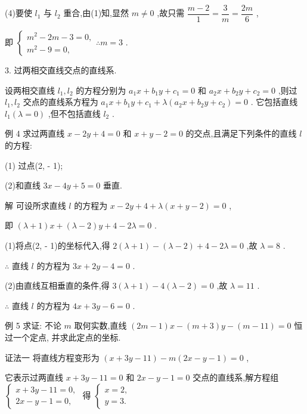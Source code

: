 (4)要使 ${l}_{1}$ 与 ${l}_{2}$ 重合,由(1)知,显然 $m \neq  0$ ,故只需 $\dfrac{m - 2}{1} = \dfrac{3}{m} = \dfrac{2m}{6}$ ,

即 $\left\{  {\begin{array}{l} {m}^{2} - {2m} - 3 = 0, \\  {m}^{2} - 9 = 0, \end{array}\therefore m = 3}\right.$ .

3. 过两相交直线交点的直线系.

设两相交直线 ${l}_{1},{l}_{2}$ 的方程分别为 ${a}_{1}x + {b}_{1}y + {c}_{1} = 0$ 和 ${a}_{2}x + {b}_{2}y + {c}_{2} = 0$ ,则过 ${l}_{1},{l}_{2}$ 交点的直线系方程为 ${a}_{1}x + {b}_{1}y + {c}_{1} + \lambda \left( {{a}_{2}x + {b}_{2}y + {c}_{2}}\right)  = 0$ . 它包括直线 ${l}_{1}\left( {\lambda  = 0}\right)$ ,但不包括直线 ${l}_{2}$ .

例 4 求过两直线 $x - {2y} + 4 = 0$ 和 $x + y - 2 = 0$ 的交点,且满足下列条件的直线 $l$ 的方程:

(1) 过点(2, - 1);

(2)和直线 ${3x} - {4y} + 5 = 0$ 垂直.

解 可设所求直线 $l$ 的方程为 $x - {2y} + 4 + \lambda \left( {x + y - 2}\right)  = 0$ ,

即 $\left( {\lambda  + 1}\right) x + \left( {\lambda  - 2}\right) y + 4 - {2\lambda } = 0$ .

(1)将点(2, - 1)的坐标代入,得 $2\left( {\lambda  + 1}\right)  - \left( {\lambda  - 2}\right)  + 4 - {2\lambda } = 0$ ,故 $\lambda  = 8$ .

$\therefore$ 直线 $l$ 的方程为 ${3x} + {2y} - 4 = 0$ .

(2)由直线互相垂直的条件,得 $3\left( {\lambda  + 1}\right)  - 4\left( {\lambda  - 2}\right)  = 0$ ,故 $\lambda  = {11}$ .

$\therefore$ 直线 $l$ 的方程为 ${4x} + {3y} - 6 = 0$ .

例 5 求证: 不论 $m$ 取何实数,直线 $\left( {{2m} - 1}\right) x - \left( {m + 3}\right) y - \left( {m - {11}}\right)  = 0$ 恒过一个定点, 并求此定点的坐标.

证法一 将直线方程变形为 $\left( {x + {3y} - {11}}\right)  - m\left( {{2x} - y - 1}\right)  = 0$ ,

它表示过两直线 $x + {3y} - {11} = 0$ 和 ${2x} - y - 1 = 0$ 交点的直线系,解方程组 $\left\{  {\begin{array}{l} x + {3y} - {11} = 0, \\  {2x} - y - 1 = 0, \end{array}\text{ 得 }\left\{  \begin{array}{l} x = 2, \\  y = 3. \end{array}\right. }\right.$

